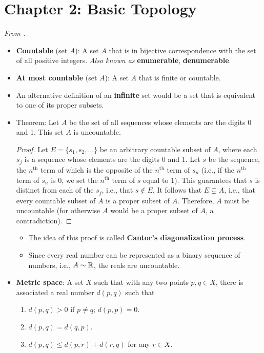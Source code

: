 \documentclass[../../notes.tex]{subfiles}
\begin{document}
\section{Chapter 2: Basic Topology}
\emph{From \textcite{bib:Rudin}.}
\begin{itemize}
    \item {}\textbf{Countable} (set $A$): A set $A$ that is in bijective correspondence with the set of all positive integers. \emph{Also known as} \textbf{enumerable}, \textbf{denumerable}.
    \item \textbf{At most countable} (set $A$): A set $A$ that is finite or countable.
    \item An alternative definition of an \textbf{infinite} set would be a set that is equivalent to one of its proper subsets.
    \item Theorem: Let $A$ be the set of all sequences whose elements are the digits 0 and 1. This set $A$ is uncountable.
    \begin{proof}
        Let $E=\{s_1,s_2,\dots\}$ be an arbitrary countable subset of $A$, where each $s_j$ is a sequence whose elements are the digits 0 and 1. Let $s$ be the sequence, the $n^\text{th}$ term of which is the opposite of the $n^\text{th}$ term of $s_n$ (i.e., if the $n^\text{th}$ term of $s_n$ is 0, we set the $n^\text{th}$ term of $s$ equal to 1). This guarantees that $s$ is distinct from each of the $s_j$, i.e., that $s\notin E$. It follows that $E\subsetneq A$, i.e., that every countable subset of $A$ is a proper subset of $A$. Therefore, $A$ must be uncountable (for otherwise $A$ would be a proper subset of $A$, a contradiction).
    \end{proof}
    \begin{itemize}
        \item The idea of this proof is called \textbf{Cantor's diagonalization process}.
        \item Since every real number can be represented as a binary sequence of numbers, i.e., $A\sim\mathbb{R}$, the reals are uncountable.
    \end{itemize}
    \item \textbf{Metric space}: A set $X$ such that with any two points $p,q\in X$, there is associated a real number $d(p,q)$ such that
    \begin{enumerate}
        \item $d(p,q)>0$ if $p\neq q$; $d(p,p)=0$.
        \item $d(p,q)=d(q,p)$.
        \item $d(p,q)\leq d(p,r)+d(r,q)$ for any $r\in X$.

\end{enumerate}
\end{itemize}
\end{document}
